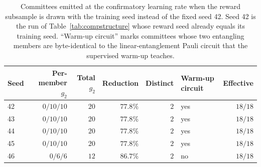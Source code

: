 \begin{table}[t]
\centering
\caption{Committees emitted at the confirmatory learning rate when the reward subsample
is drawn with the training seed instead of the fixed seed 42. Seed 42 is the run of
Table~\ref{tab:compstructure} whose reward seed already equals its training seed.
``Warm-up circuit'' marks committees whose two entangling members are byte-identical to
the linear-entanglement Pauli circuit that the supervised warm-up teaches.}
\label{tab:s3structure}
\begin{tabular}{@{}lrrrrlr@{}}
\toprule
Seed & Per-member $g_2$ & Total $g_2$ & Reduction & Distinct & Warm-up circuit & Effective \\
\midrule
42 & $0/10/10$ & $20$ & $77.8\%$ & $2$ & yes & $18/18$ \\
43 & $0/10/10$ & $20$ & $77.8\%$ & $2$ & yes & $18/18$ \\
44 & $0/10/10$ & $20$ & $77.8\%$ & $2$ & yes & $18/18$ \\
45 & $0/10/10$ & $20$ & $77.8\%$ & $2$ & yes & $18/18$ \\
46 & $0/6/6$ & $12$ & $86.7\%$ & $2$ & no & $18/18$ \\
\bottomrule
\end{tabular}
\end{table}
